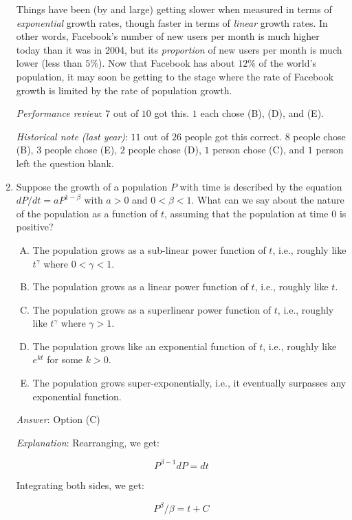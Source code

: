 \documentclass[10pt]{amsart}
\begin{document}
\begin{enumerate}
  Things have been (by and large) getting slower when measured in
  terms of {\em exponential} growth rates, though faster in terms of
  {\em linear} growth rates. In other words, Facebook's number of new
  users per month is much higher today than it was in 2004, but its
  {\em proportion} of new users per month is much lower (less than
  $5\%$). Now that Facebook has about $12\%$ of the world's population,
  it may soon be getting to the stage where the rate of Facebook
  growth is limited by the rate of population growth.

  {\em Performance review}: $7$ out of $10$ got this. $1$ each chose
  (B), (D), and (E).

  {\em Historical note (last year)}: $11$ out of $26$ people got this
  correct. $8$ people chose (B), $3$ people chose (E), $2$ people
  chose (D), $1$ person chose (C), and $1$ person left the question
  blank.

\item Suppose the growth of a population $P$ with time is described by
  the equation $dP/dt = aP^{1 - \beta}$ with $a > 0$ and $0 < \beta <
  1$. What can we say about the nature of the population as a function
  of $t$, assuming that the population at time $0$ is positive?

  \begin{enumerate}[(A)]
  \item The population grows as a sub-linear power function of $t$,
    i.e., roughly like $t^\gamma$ where $0 < \gamma < 1$.
  \item The population grows as a linear power function of $t$, i.e.,
    roughly like $t$.
  \item The population grows as a superlinear power function of $t$,
    i.e., roughly like $t^\gamma$ where $\gamma > 1$.
  \item The population grows like an exponential function of $t$,
    i.e., roughly like $e^{kt}$ for some $k > 0$.
  \item The population grows super-exponentially, i.e., it eventually
  surpasses any exponential function.
  \end{enumerate}
  
  {\em Answer}: Option (C)

  {\em Explanation}: Rearranging, we get:

  $$P^{\beta - 1} dP = dt$$

  Integrating both sides, we get:

  $$P^\beta/\beta = t + C$$


\end{enumerate}
\end{document}
